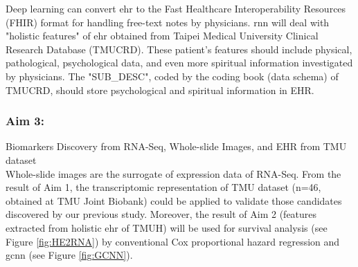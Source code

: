 \documentclass[12pt, a4paper]{article}
\begin{document}
Deep learning can convert \acrfull{ehr} to the Fast Healthcare Interoperability Resources (FHIR) format\citep{Rajkomar2018}\citep{HealthLevelSeven2019} for handling free-text notes by physicians.
\acrfull{rnn} will deal with "holistic features" of \acrshort{ehr} obtained from Taipei Medical University Clinical Research Database (TMUCRD).
These patient's features should include physical, pathological, psychological data, and even more spiritual information investigated by physicians.
The "SUB\_DESC", coded by the coding book (data schema) of TMUCRD, should store psychological and spiritual information in EHR.



\subsubsection*{Aim 3:} Biomarkers Discovery from RNA-Seq, Whole-slide Images, and EHR from TMU dataset\\[0.5cm]


Whole-slide images are the surrogate of expression data of RNA-Seq.
From the result of Aim 1, the transcriptomic representation of TMU dataset (n=46, obtained at TMU Joint Biobank) could be applied to validate those candidates discovered by our previous study.
Moreover, the result of Aim 2 (features extracted from holistic \acrshort{ehr} of TMUH) will be used for survival analysis (see Figure \ref{fig:HE2RNA}) by conventional Cox proportional hazard regression and \acrshort{gcnn} (see Figure \ref{fig:GCNN}). %
\end{document}
